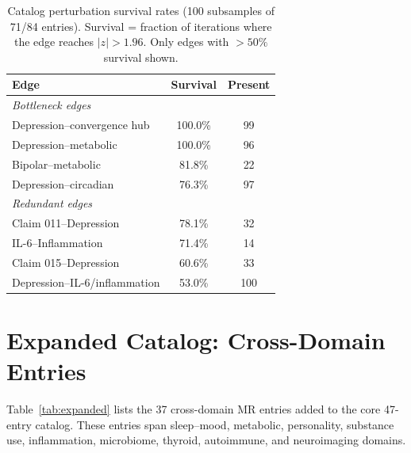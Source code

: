 \documentclass[11pt]{article}
\begin{document}
\begin{table}[h]
\centering
\caption{Catalog perturbation survival rates (100 subsamples of 71/84 entries). Survival = fraction of iterations where the edge reaches $|z| > 1.96$. Only edges with $> 50\%$ survival shown.}
\label{tab:perturbation}
\small
\begin{tabular}{lcc}
\toprule
Edge & Survival & Present \\
\midrule
\multicolumn{3}{l}{\emph{Bottleneck edges}} \\
Depression--convergence hub & 100.0\% & 99 \\
Depression--metabolic & 100.0\% & 96 \\
Bipolar--metabolic & 81.8\% & 22 \\
Depression--circadian & 76.3\% & 97 \\
\midrule
\multicolumn{3}{l}{\emph{Redundant edges}} \\
Claim 011--Depression & 78.1\% & 32 \\
IL-6--Inflammation & 71.4\% & 14 \\
Claim 015--Depression & 60.6\% & 33 \\
Depression--IL-6/inflammation & 53.0\% & 100 \\
\bottomrule
\end{tabular}
\end{table}

\section{Expanded Catalog: Cross-Domain Entries}
\label{app:expanded}

Table~\ref{tab:expanded} lists the 37 cross-domain MR entries added to the core 47-entry catalog. These entries span sleep--mood, metabolic, personality, substance use, inflammation, microbiome, thyroid, autoimmune, and neuroimaging domains.
\end{document}
